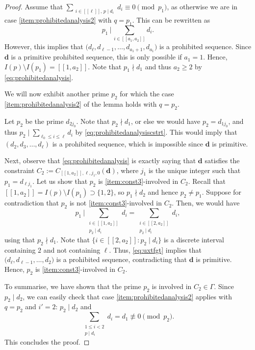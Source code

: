 \documentclass[11pt]{amsart}
\theoremstyle{definition}
\renewcommand{\leq}{\leqslant}
\renewcommand{\geq}{\geqslant}
\newcommand{\interval}[2]{[\![#1,#2]\!] }
\newcommand{\sinterval}[1]{[\![#1]\!] }
\renewcommand{\d}{\boldsymbol{d}}
\newcommand{\pcomp}[2]{d_{#1#2}}
\newcommand{\bmid}{\  \Big\vert}
\newcommand{\ellp}{\ell}
\newcommand{\ellm}{\ell_0}
\newcommand{\pplus}{p_{1}}
\newcommand{\pminus}{p_2}
\newcommand{\mprimeone}{p}
\newcommand{\mprimetwo}{q}
\begin{document}
\begin{proof}
Assume that $\sum_{\substack{i\in \sinterval{\ellp},\, \mprimeone\mid d_i}} d_i \equiv 0 \pmod{\pplus}$, as otherwise we are in case \cref{item:prohibitedanalysis2} with $\mprimetwo = \pplus$. This can be rewritten as
\begin{equation}
\label{eq:prohibitedanalysis}
	\pplus \bmid\,  \sum_{i\in \interval{a_1}{a_2}} d_i.
\end{equation} 
However, this implies that $\big(d_{\ellp}, d_{\ellp-1}, \ldots, d_{a_1+1}, d_{a_1}\big)$ is a prohibited sequence. Since $\d$ is a primitive prohibited sequence, this is only possible if $a_1=1$. Hence, $I(\mprimeone) \setminus I(\pplus) = \interval{1}{a_2}$. Note that $\pplus \nmid d_1$ and thus $a_2\geq 2$ by \cref{eq:prohibitedanalysis}.

We will now exhibit another prime $\pminus$ for which the case \cref{item:prohibitedanalysis2} of the lemma holds with $\mprimetwo = \pminus$.

Let $\pminus$ be the prime $\pcomp{2}{j_0}$. Note that $\pminus \nmid d_1$, or else we would have $\pminus = \pcomp{1}{j_0}$, and thus ${\pminus \mid \sum_{\ellm\leq i\leq \ellp} d_i}$ by \cref{eq:prohibitedanalysiscstrt}. This would imply that $(d_{2}, d_{3}, \ldots, d_{\ellp})$ is a prohibited sequence, which is impossible since $\d$ is primitive. 

Next, observe that \cref{eq:prohibitedanalysis} is exactly saying that $\d$ satisfies the constraint ${C_2 := C_{\interval{1}{a_2},\ellp,j_1,0}(\d)}$, where $j_1$ is the unique integer such that $\pplus = \pcomp{\ellp}{j_1}$. Let us show that $\pminus$ is \cref{item:const3}-involved in $C_2$. Recall that $\interval{1}{a_2} = I(\mprimeone) \setminus I(\pplus) \supset \{1,2\}$, so $\pplus \nmid d_2$ and hence $\pminus \neq \pplus$. Suppose for contradiction that $\pminus$ is not \cref{item:const3}-involved in $C_2$. Then, we would have
\begin{equation}
\label{eq:uxtfgt}
	\pplus \bmid\, \sum_{\substack{i\in \interval{1}{a_2}\\ \pminus \mid d_i}} d_i = \sum_{\substack{i\in \interval{2}{a_2}\\ \pminus \mid d_i}} d_i,
\end{equation}
using that $\pminus \nmid d_1$. Note that $\{i\in \interval{2}{a_2}: \pminus \mid d_i\}$ is a discrete interval containing $2$ and not containing $\ellp$. Thus, \cref{eq:uxtfgt} implies that $\big(d_{\ellp}, d_{\ellp-1}, \ldots, d_{2}\big)$ is a prohibited sequence, contradicting that $\d$ is primitive. Hence, $\pminus$ is \cref{item:const3}-involved in $C_2$.

To summarise, we have shown that the prime $\pminus$ is involved in $C_2\in \Gamma$. Since $\pminus \mid d_2$, we can easily check that case \cref{item:prohibitedanalysis2} applies with $\mprimetwo=\pminus$ and $i' = 2$: $\pminus \mid d_2$ and
\begin{equation*}
	\sum_{\substack{1\leq i<2\\ \mprimeone\mid d_i}} d_i = d_1 \not\equiv 0 \pmod{\pminus}.
\end{equation*}
This concludes the proof.
\end{proof}
\end{document}
